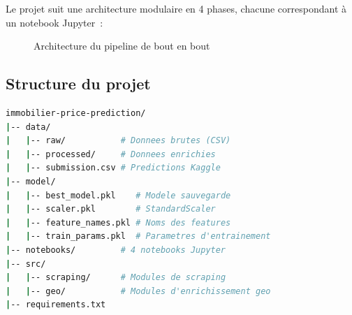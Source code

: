 \documentclass[12pt, a4paper]{article}
\begin{document}
Le projet suit une architecture modulaire en 4 phases, chacune correspondant à un notebook Jupyter~:

\begin{figure}[H]
\centering
{}
\caption{Architecture du pipeline de bout en bout}
\label{fig:pipeline}
\end{figure}

\subsection{Structure du projet}

\begin{lstlisting}[language=bash, caption=Arborescence du projet]
immobilier-price-prediction/
|-- data/
|   |-- raw/           # Donnees brutes (CSV)
|   |-- processed/     # Donnees enrichies
|   |-- submission.csv # Predictions Kaggle
|-- model/
|   |-- best_model.pkl    # Modele sauvegarde
|   |-- scaler.pkl        # StandardScaler
|   |-- feature_names.pkl # Noms des features
|   |-- train_params.pkl  # Parametres d'entrainement
|-- notebooks/         # 4 notebooks Jupyter
|-- src/
|   |-- scraping/      # Modules de scraping
|   |-- geo/           # Modules d'enrichissement geo
|-- requirements.txt
\end{lstlisting}
\end{document}
